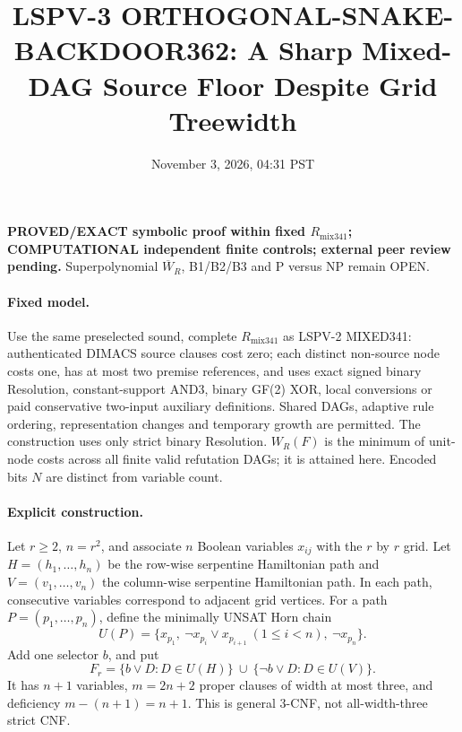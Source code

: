 \documentclass[11pt]{article}
\title{LSPV-3 ORTHOGONAL-SNAKE-BACKDOOR362: A Sharp Mixed-DAG Source Floor Despite Grid Treewidth}
\date{November 3, 2026, 04:31 PST}
\begin{document}
\maketitle
\noindent\textbf{PROVED/EXACT symbolic proof within fixed $R_{\mathrm{mix341}}$; COMPUTATIONAL independent finite controls; external peer review pending.} Superpolynomial $\overline W_R$, B1/B2/B3 and P versus NP remain OPEN.

\paragraph{Fixed model.} Use the same preselected sound, complete $R_{\mathrm{mix341}}$ as LSPV-2 MIXED341: authenticated DIMACS source clauses cost zero; each distinct non-source node costs one, has at most two premise references, and uses exact signed binary Resolution, constant-support AND3, binary GF(2) XOR, local conversions or paid conservative two-input auxiliary definitions. Shared DAGs, adaptive rule ordering, representation changes and temporary growth are permitted. The construction uses only strict binary Resolution. $W_R(F)$ is the minimum of unit-node costs across all finite valid refutation DAGs; it is attained here. Encoded bits $N$ are distinct from variable count.

\paragraph{Explicit construction.} Let $r\ge2$, $n=r^2$, and associate $n$ Boolean variables $x_{ij}$ with the $r$ by $r$ grid. Let $H=(h_1,\dots,h_n)$ be the row-wise serpentine Hamiltonian path and $V=(v_1,\dots,v_n)$ the column-wise serpentine Hamiltonian path. In each path, consecutive variables correspond to adjacent grid vertices. For a path $P=(p_1,\dots,p_n)$, define the minimally UNSAT Horn chain
\[
U(P)=\{x_{p_1},\ \neg x_{p_i}\lor x_{p_{i+1}}\ (1\le i<n),\ \neg x_{p_n}\}.
\]
Add one selector $b$, and put
\[
F_r=\{b\lor D:D\in U(H)\}\ \cup\
\{\neg b\lor D:D\in U(V)\}.
\]
It has $n+1$ variables, $m=2n+2$ proper clauses of width at most three, and deficiency $m-(n+1)=n+1$. This is general 3-CNF, not all-width-three strict CNF.
\end{document}
